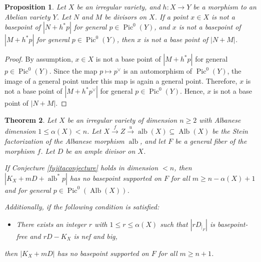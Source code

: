 \documentclass[sn-mathphys-num]{sn-jnl}%
\newtheorem{theorem}{Theorem}[section]
\newtheorem{proposition}[theorem]{Proposition}
\theoremstyle{definition}
\numberwithin{equation}{section}
\begin{document}
\begin{proposition}\label{newpropo}
Let $X$ be an irregular variety, and $h:X \to Y$ be a morphism to an Abelian variety $Y$. Let $N$ and $M$ be divisors on $X$. If a point $x \in X$ is not a basepoint of $|N + h^{*}p|$ for  general $p \in \operatorname{Pic}^{0}(Y)$,
and $x$ is not a basepoint of $|M + h^{*}p|$ for  general $p \in  \operatorname{Pic}^{0}(Y)$, then $x$ is not a base point of $|N +M|$.
\end{proposition}
\begin{proof}
By assumption, \( x \in X \) is not a base point of \( |M + h^{*}p| \) for general \( p \in \operatorname{Pic}^{0}(Y) \). Since the map \( p \mapsto p^{\vee} \) is an automorphism of \( \operatorname{Pic}^{0}(Y) \), the image of a general point under this map is again a general point. Therefore, \( x \) is not a base point of \( |M + h^{*}p^{\vee}| \) for general \( p \in \operatorname{Pic}^{0}(Y) \). Hence, \( x \) is not a base point of \( |N + M| \).
\end{proof}
\begin{theorem}\label{maintheorem1}
Let $X$ be an irregular variety of dimension $n\geq 2$ with Albanese dimension $1 \leq \alpha(X)<n$. Let $X \xrightarrow{f} Z \xrightarrow{u} \operatorname{alb}(X) \subseteq \operatorname{Alb}(X)$ be the Stein factorization of the Albanese morphism $\operatorname{alb}$, and let $F$ be a general fiber of the morphism $f$. Let $D$ be an ample divisor on $X$. 
\par If  Conjecture \ref{fujitaconjecture} holds in dimension $<n$, then $|K_{X} + mD + \operatorname{alb}^{*}p|$ has no  basepoint supported on $F$ for all $m \geq n-\alpha(X)+1$ and for general $p \in \operatorname{Pic}^{0}(\operatorname{Alb}(X))$.
\par Additionally, if the following condition is satisfied:
\begin{itemize}
    \item[$(*)$]There exists an integer $r$ with $1\leq r \leq \alpha(X)$ such that $|rD_{|_{F}}|$ is basepoint-free and $rD - K_{X}$ is nef and big,
\end{itemize}
then $|K_{X} + mD|$ has no  basepoint supported on $F$ for all $m \geq n+1$.
\end{theorem}
\end{document}
